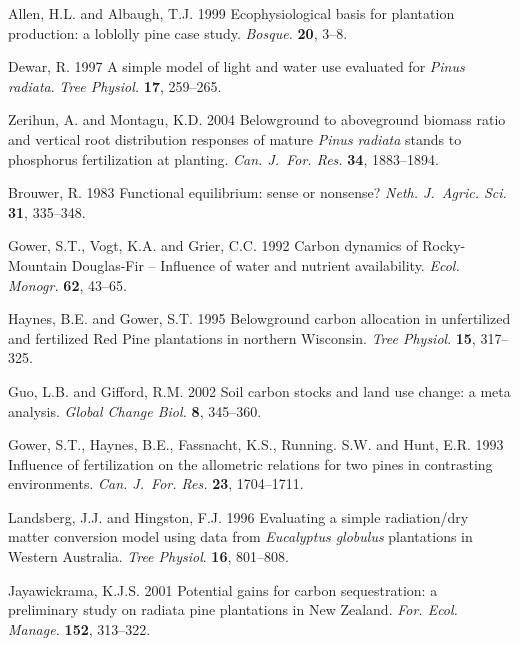 \documentclass[final]{foresj}
\begin{document}
\begin{thebibliography}
Allen, H.L. and Albaugh, T.J. 1999 Ecophysiological basis
for plantation production: a loblolly pine case study.
\textit{Bosque.} \textbf{20}, 3--8.

Dewar, R. 1997 A simple model of light and water use
evaluated for \textit{Pinus radiata}. \textit{Tree
Physiol.} \textbf{17}, 259--265.

Zerihun, A. and Montagu, K.D. 2004 Belowground to
aboveground biomass ratio and vertical root distribution
responses of mature \textit{Pinus radiata} stands to
phosphorus fertilization at planting. \textit{Can. J.~For.
Res.} \textbf{34}, 1883--1894.


Brouwer, R. 1983 Functional equilibrium: sense or nonsense?
\textit{Neth. J.~Agric. Sci.} \textbf{31}, 335--348.

Gower, S.T., Vogt, K.A. and Grier, C.C. 1992 Carbon
dynamics of Rocky-Mountain Douglas-Fir -- Influence of
water and nutrient availability. \textit{Ecol. Monogr.}
\textbf{62}, 43--65.

Haynes, B.E. and Gower, S.T. 1995 Belowground carbon
allocation in unfertilized and fertilized Red Pine
plantations in northern Wisconsin. \textit{Tree Physiol}.
\textbf{15}, 317--325.

Guo, L.B. and Gifford, R.M. 2002 Soil carbon stocks and
land use change: a meta analysis. \textit{Global Change
Biol.} \textbf{8}, 345--360.

Gower, S.T., Haynes, B.E., Fassnacht, K.S., Running. S.W.
and Hunt, E.R. 1993 Influence of fertilization on the
allometric relations for two pines in contrasting
environments. \textit{Can. J.~For. Res.} \textbf{23},
1704--1711.

Landsberg, J.J. and Hingston, F.J. 1996 Evaluating a simple
radiation/dry matter conversion model using data from
\textit{Eucalyptus globulus} plantations in Western
Australia. \textit{Tree Physiol}. \textbf{16}, 801--808.

Jayawickrama, K.J.S. 2001 Potential gains for carbon
sequestration: a preliminary study on radiata pine
plantations in New Zealand. \textit{For. Ecol. Manage.}
\textbf{152}, 313--322.


\end{thebibliography}
\end{document}

